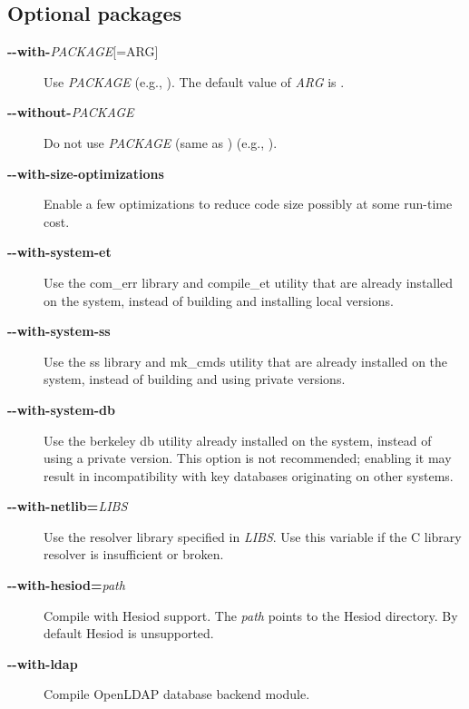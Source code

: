 \documentclass[letterpaper,10pt,english]{sphinxmanual}
\begin{document}
\subsection{Optional packages}
\label{build/options2configure:optional-packages}\begin{description}
\item[{\textbf{-}\textbf{-with-}\emph{PACKAGE}{[}=ARG{]}}] \leavevmode
Use \emph{PACKAGE} (e.g., ).  The default value of \emph{ARG}
is .

\item[{\textbf{-}\textbf{-without-}\emph{PACKAGE}}] \leavevmode
Do not use \emph{PACKAGE} (same as )
(e.g., ).

\item[{\textbf{-}\textbf{-with-size-optimizations}}] \leavevmode
Enable a few optimizations to reduce code size possibly at some
run-time cost.

\item[{\textbf{-}\textbf{-with-system-et}}] \leavevmode
Use the com\_err library and compile\_et utility that are already
installed on the system, instead of building and installing
local versions.

\item[{\textbf{-}\textbf{-with-system-ss}}] \leavevmode
Use the ss library and mk\_cmds utility that are already installed
on the system, instead of building and using private versions.

\item[{\textbf{-}\textbf{-with-system-db}}] \leavevmode
Use the berkeley db utility already installed on the system,
instead of using a private version.  This option is not
recommended; enabling it may result in incompatibility with key
databases originating on other systems.

\item[{\textbf{-}\textbf{-with-netlib=}\emph{LIBS}}] \leavevmode
Use the resolver library specified in \emph{LIBS}.  Use this variable
if the C library resolver is insufficient or broken.

\item[{\textbf{-}\textbf{-with-hesiod=}\emph{path}}] \leavevmode
Compile with Hesiod support.  The \emph{path} points to the Hesiod
directory.  By default Hesiod is unsupported.

\item[{\textbf{-}\textbf{-with-ldap}}] \leavevmode
Compile OpenLDAP database backend module.


\end{description}
\end{document}
